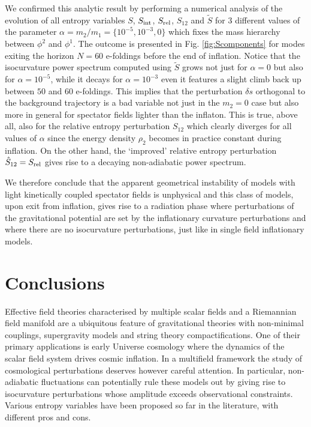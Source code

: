 \documentclass[a4paper,11pt]{article}
\begin{document}
We confirmed this analytic result by performing a numerical analysis of the evolution of all entropy variables $S$, $S_{\rm int}$, $S_{\rm rel}$, $S_{12}$ and $\tilde{S}$ for 3 different values of the parameter $\alpha=m_2/m_1=\{10^{-5},10^{-3},0\}$ which fixes the mass hierarchy between $\phi^2$ and $\phi^1$. The outcome is presented in Fig. \ref{fig:Scomponents} for modes exiting the horizon $N=60$ e-foldings before the end of inflation. Notice that the isocurvature power spectrum computed using $\tilde{S}$ grows not just for $\alpha=0$ but also for $\alpha=10^{-5}$, while it decays for $\alpha=10^{-3}$ even it features a slight climb back up between $50$ and $60$ e-foldings. This implies that the perturbation $\delta s$ orthogonal to the background trajectory is a bad variable not just in the $m_2=0$ case but also more in general for spectator fields lighter than the inflaton. This is true, above all, also for the relative entropy perturbation $S_{12}$ which clearly diverges for all values of $\alpha$ since the energy density $\rho_2$ becomes in practice constant during inflation. On the other hand, the `improved' relative entropy perturbation $\hat{S}_{12}=S_{\rm rel}$ gives rise to a decaying non-adiabatic power spectrum. 

We therefore conclude that the apparent geometrical instability of models with light kinetically coupled spectator fields is unphysical and this class of models, upon exit from inflation, gives rise to a radiation phase where perturbations of the gravitational potential are set by the inflationary curvature perturbations and where there are no isocurvature perturbations, just like in single field inflationary models.


\section{Conclusions}
\label{sec:Conclusions}

Effective field theories characterised by multiple scalar fields and a Riemannian field manifold are a ubiquitous feature of gravitational theories with non-minimal couplings, supergravity models and string theory compactifications. One of their primary applications is early Universe cosmology where the dynamics of the scalar field system drives cosmic inflation. In a multifield framework the study of cosmological perturbations deserves however careful attention. In particular, non-adiabatic fluctuations can potentially rule these models out by giving rise to isocurvature perturbations whose amplitude exceeds observational constraints. Various entropy variables have been proposed so far in the literature, with different pros and cons.
\end{document}
